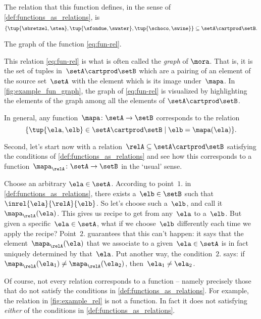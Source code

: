 The relation that this function defines, in the sense of \cref{def:functions_as_relations}, is
%
\begin{equation*}
    \label{eq:fun-rel}
    \{ \tup{\sbretzel, \stea}, \tup{\sfondue, \swater}, \tup{\schoco, \swine} \} \subseteq \setA \cartprod \setB.
\end{equation*}

\begin{marginfigure}
    \centering
    \caption{The graph of the function \cref{eq:fun-rel}.}
    \label{fig:example_fun_graph}
\end{marginfigure}

This relation \cref{eq:fun-rel} is what is often called the \emph{graph} of $\mora$.
That is, it is the set of tuples in~$\setA \cartprod \setB$ which are a pairing of an element of the source set~$\setA$ with the element which is its image under~$\mapa$. In \cref{fig:example_fun_graph}, the graph of \cref{eq:fun-rel} is visualized by highlighting the elements of the graph among all the elements of $\setA \cartprod \setB$.

In general, any function~$\mapa \colon \setA \to \setB$ corresponds to the relation
\begin{equation*}
   \{ \tup{\ela,\elb} \in \setA \cartprod \setB \mid \elb= \mapa(\ela) \}.
\end{equation*}


Second, let's start now with a relation~$\relA \subseteq \setA \cartprod \setB$ satisfying the conditions of \cref{def:functions_as_relations} and see how this corresponds to a function~$\mapa_\relA \colon \setA \to \setB$ in the `usual' sense.

Choose an arbitrary $\ela \in \setA$. According to point~$1.$ in \cref{def:functions_as_relations}, there exists a~$\elb \in \setB$ such that~$\inrel{\ela}{\relA}{\elb}$.
So let's choose such a~$\elb$, and call it~$\mapa_\relA(\ela)$.
This gives us recipe to get from any~$\ela$ to a~$\elb$.
But given a specific~$\ela \in \setA$, what if we choose~$\elb$ differently each time we apply the recipe?
Point~$2.
$ guarantees that this can't happen: it says that the element~$\mapa_\relA(\ela)$ that we associate to a given~$\ela \in \setA$ is in fact uniquely determined by that~$\ela$.
Put another way, the condition~$2.
$ says: if~$\mapa_\relA(\ela_1) \neq \mapa_\relA(\ela_2)$, then~$\ela_1 \neq\ela_2$.


\begin{remark}
Of course, not every relation corresponds to a function -- namely precisely those that do not satisfy the conditions in \cref{def:functions_as_relations}. For example, the relation in \cref{fig:example_rel} is not a function. In fact it does not satisfying \emph{either} of the conditions in \cref{def:functions_as_relations}.
\end{remark}




